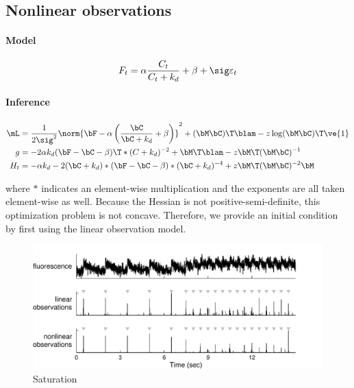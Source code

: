 \subsection{Nonlinear observations}
\paragraph{Model}

\begin{align}
	F_t = \alpha \frac{C_t}{C_t + k_d} + \beta + \sig \varepsilon_t
\end{align}

\paragraph{Inference}

\begin{subequations} 
\begin{align}
\mL &= \frac{1}{2\sig^2} \norm{\bF - \alpha\left( \frac{\bC}{\bC+k_d} + \beta\right)}^2 + (\bM \bC)\T \blam - z \log (\bM\bC)\T \ve{1}  \\
g &= -2 \alpha k_d (\bF - \bC - \beta)\T  \ast (C+k_d)^{-2} + \bM\T\blam - z \bM\T (\bM\bC)^{-1} \\
H_{t} &= -\alpha k_d - 2(\bC + k_d) \ast (\bF-\bC-\beta) \ast (\bC + k_d)^{-4} + z \bM\T (\bM \bC)^{-2} \bM
\end{align}
\end{subequations}

\noindent where $\ast$ indicates an element-wise multiplication and the exponents are all taken element-wise as well. Because the Hessian is not positive-semi-definite, this optimization problem is not concave.  Therefore, we provide an initial condition by first using the linear observation model.  

\begin{figure}[h!]
\centering \includegraphics[width=.9\linewidth]{../figs/nonlin}
\caption{Saturation} \label{fig:satur}
\end{figure}

